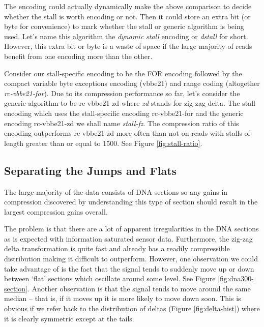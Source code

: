
The encoding could actually dynamically make the above comparison to decide
whether the stall is worth encoding or not. Then it could store an extra bit (or
byte for convenience) to mark whether the stall or generic algorithm is being
used. Let's name this algorithm the \textit{dynamic stall} encoding or
\textit{dstall} for short. However, this extra bit or byte is a waste of space
if the large majority of reads benefit from one encoding more than the other.

Consider our stall-specific encoding to be the FOR encoding followed by the
compact variable byte exceptions encoding (vbbe21) and range coding (altogether
\textit{rc-vbbe21-for}). Due to its compression performance so far, let's
consider the generic algorithm to be rc-vbbe21-zd where \textit{zd} stands for
zig-zag delta. The stall encoding which uses the stall-specific encoding
rc-vbbe21-for and the generic encoding rc-vbbe21-zd we shall name
\textit{stall-fz}. The compression ratio of this encoding outperforms
rc-vbbe21-zd more often than not on reads with stalls of length greater than or
equal to 1500. See Figure \ref{fig:stall-ratio}.



\subsection{Separating the Jumps and Flats}

The large majority of the data consists of DNA sections so any gains in
compression discovered by understanding this type of section should
result in the largest compression gains overall.

The problem is that there are a lot of apparent irregularities in the DNA
sections as is expected with information saturated sensor data. Furthermore, the
zig-zag delta transformation is quite fast and already has a readily
compressible distribution making it difficult to outperform. However, one
observation we could take advantage of is the fact that the signal tends to
suddenly move up or down between `flat' sections which oscillate around some
level. See Figure \ref{fig:dna300-section}. Another observation is that the
signal tends to move around the same median -- that is, if it moves up it is
more likely to move down soon. This is obvious if we refer back to the
distribution of deltas (Figure \ref{fig:delta-hist}) where it is clearly
symmetric except at the tails.

